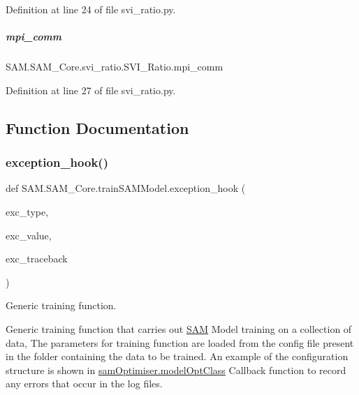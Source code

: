 Definition at line 24 of file svi\+\_\+ratio.\+py.

\mbox{\label{group__icubclient__SAM__Core_ac3cf9db01577d16c662da835de33216d}} 
\subparagraph{\texorpdfstring{mpi\+\_\+comm}{mpi\_comm}}
{\footnotesize\ttfamily S\+A\+M.\+S\+A\+M\+\_\+\+Core.\+svi\+\_\+ratio.\+S\+V\+I\+\_\+\+Ratio.\+mpi\+\_\+comm}



Definition at line 27 of file svi\+\_\+ratio.\+py.



\subsection{Function Documentation}
\mbox{\label{group__icubclient__SAM__Core_gab9063d062c168b9c621a28ab469ae1f9}} 
\subsubsection{\texorpdfstring{exception\+\_\+hook()}{exception\_hook()}}
{\footnotesize\ttfamily def S\+A\+M.\+S\+A\+M\+\_\+\+Core.\+train\+S\+A\+M\+Model.\+exception\+\_\+hook (\begin{DoxyParamCaption}\item[{}]{exc\+\_\+type,  }\item[{}]{exc\+\_\+value,  }\item[{}]{exc\+\_\+traceback }\end{DoxyParamCaption})}



Generic training function. 

Generic training function that carries out \hyperlink{namespaceSAM}{S\+AM} Model training on a collection of data, The parameters for training function are loaded from the config file present in the folder containing the data to be trained. An example of the configuration structure is shown in \hyperlink{group__icubclient__SAM__Core_classSAM_1_1SAM__Core_1_1samOptimiser_1_1modelOptClass}{sam\+Optimiser.\+model\+Opt\+Class} Callback function to record any errors that occur in the log files.

